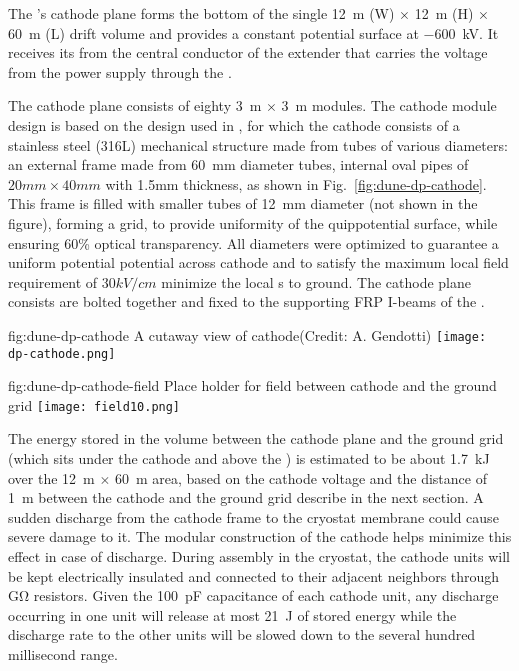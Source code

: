 The \dpmod{}'s cathode plane forms the  bottom of the single  \SI{12}{\m} (W) $\times$ \SI{12}{\m} (H) $\times$ \SI{60}{\m} (L) drift volume and provides a constant potential surface at \SI{-600}{\kV}.  It receives its \hv from the central conductor of the extender that carries the voltage from the power supply through the \hv \fdth.  

The cathode plane consists of eighty \SI{3}{\m} $\times$ \SI{3}{\m} modules. 
The cathode module design is based on the design used in  , for which the cathode consists of a stainless steel (316L) mechanical structure made from
tubes of various diameters: an external frame made from \SI{60}{\milli\m} diameter tubes, internal oval pipes of $20mm\times 40mm$ with 1.5mm thickness, as shown in Fig.~\ref{fig:dune-dp-cathode}. 
This frame is filled with smaller tubes of \SI{12}{\milli\m} diameter (not shown in the figure), forming a grid, to provide uniformity of the quippotential surface, while ensuring 60\% optical transparency. All diameters were optimized to guarantee a uniform potential  potential across cathode and to satisfy the maximum local field requirement of $30kV/cm$ minimize the local \efield{}s to ground.
The cathode plane consists are bolted together and fixed to the supporting FRP I-beams of the \fc. 


\begin{dunefigure}{fig:dune-dp-cathode}
{A cutaway view of  cathode(Credit: A. Gendotti)}
\texttt{[image: dp-cathode.png]}
\end{dunefigure}

\begin{dunefigure}{fig:dune-dp-cathode-field}
{Place holder for field between cathode and the ground grid} 
\texttt{[image: field10.png]}
\end{dunefigure}

The energy stored in the volume between the cathode plane and the ground grid (which sits under the cathode and above the ) is estimated to be about \SI{1.7}{\kilo\joule} over the \SI{12}{\m} $\times$ \SI{60}{\m} area, based on the cathode voltage and the distance of \SI{1}{\m} between the cathode and the ground grid describe in the next section. 
A sudden discharge from the cathode frame to the cryostat membrane could cause severe damage to it.  The modular construction of the cathode helps minimize this effect in case of discharge. During assembly in the cryostat, the cathode units will be kept electrically insulated and connected to their adjacent neighbors through \si{\giga\ohm}  
resistors. Given the \SI{100}{\pico\farad} capacitance of each cathode unit, any discharge occurring in one unit will release at most 
\SI{21}{\joule} of stored energy while the discharge rate  
to the other units will be slowed down to the several hundred millisecond range.

